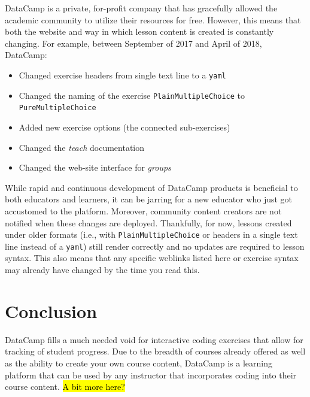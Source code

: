 \documentclass{tise_style_doi}
\begin{document}
DataCamp is a private, for-profit company that has gracefully allowed
the academic community to utilize their resources for free.  However, 
this means that both the website and way in which lesson content
is created is constantly changing.  For example, between September of
2017 and April of 2018, DataCamp:
\begin{itemize}
\item Changed exercise headers from single text line to a \texttt{yaml}
\item Changed the naming of the exercise \texttt{PlainMultipleChoice} 
to \texttt{PureMultipleChoice}
\item Added new exercise options (the connected sub-exercises)
\item Changed the \emph{teach} documentation
\item Changed the web-site interface for \emph{groups}
\end{itemize}
While rapid and continuous development of DataCamp products is beneficial 
to both educators and learners, it can be jarring for a new educator
who just got accustomed to the platform.  Moreover, community
content creators are not notified when these changes are deployed.  
Thankfully, for now, lessons created under older formats (i.e.,
with \texttt{PlainMultipleChoice} or headers in a single text
line instead of a \texttt{yaml}) still render correctly and no updates are required to
lesson syntax. This also means that any specific weblinks listed
here or exercise syntax may already have changed by the time you read this.

\section{Conclusion}

DataCamp fills a much needed void for interactive coding exercises that allow
for tracking of student progress.  Due to the breadth of courses already offered as
well as the ability to create your own course content, DataCamp is a learning
platform that can be used by any instructor that incorporates coding into their
course content.  \hl{A bit more here?}


\end{document}
